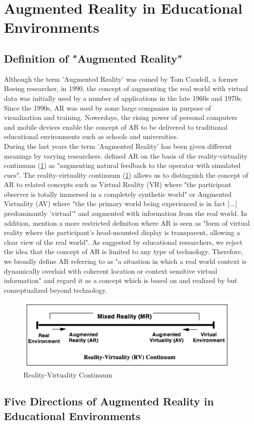 \section{Augmented Reality in Educational Environments}

\subsection{Definition of "Augmented Reality"}
Although the term 'Augmented Reality' was coined by Tom Caudell, a former Boeing researcher, in 1990, the concept of augmenting the real world with virtual data was initially used by a number of applications in the late 1960s and 1970s. Since the 1990s, AR was used by some large companies in purpose of visualization and training. Nowerdays, the rising power of personal computers and mobile devices enable the concept of AR to be delivered to traditional educational environments such as schools and universities. \autocite [cf.][21]{Johnson.2010} \\
During the last years the term 'Augmented Reality' has been given different meanings by varying researchers. \autocite [cf.][42]{Wu.2013} \cite{Milgram.1994b} defined AR on the basis of the reality-virtuality continuum (\ref{fig:RealityVirtualityContinuum}) as "augmenting natural feedback to the operator with simulated cues". \autocite[283]{Milgram.1994b} The reality-virtuality continuum (\ref{fig:RealityVirtualityContinuum}) allows us to distinguish the concept of AR to related concepts such as Virtual Reality (VR) where "the participant observer is totally immersed in a completely synthetic world" \autocite[283]{Milgram.1994b} or Augmented Virtuality (AV) where "the the primary world being experienced is in fact [...] predominantly 'virtual'"\autocite[4]{Milgram.1994} and augmented with information from the real world. In addition, \cite{Milgram.1994b} mention a more restricted definiton where AR is seen as "form of virtual reality where the participant's head-mounted display is transparent, allowing a clear view of the real world". \autocite[283]{Milgram.1994b} As suggested by educational researchers,\autocite[cf.][42]{Wu.2013} we reject the idea that the concept of AR is limited to any type of technology. Therefore, we broadly define AR referring to \cite{Klopfer.2008} as "a situation in which a real world context is dynamically overlaid with coherent location or context sensitive virtual information"\autocite[205]{Klopfer.2008} and regard it as a concept which is based on and realized by but conzeptualized beyond technology.
\begin{figure}[ptbh]
    \centering
    \includegraphics[width=\linewidth]{figures/rvc.png}
    \caption[Reality-Virtuality Continuum]{Reality-Virtuality Continuum}
    \label{fig:RealityVirtualityContinuum}
\end{figure}
\subsection{Five Directions of Augmented Reality in Educational Environments}